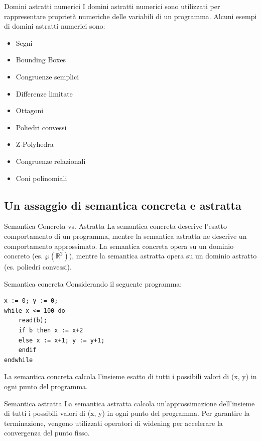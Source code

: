\begin{definizione}{Domini astratti numerici}{}
I domini astratti numerici sono utilizzati per rappresentare proprietà
numeriche delle variabili di un programma.
Alcuni esempi di domini astratti numerici sono:
\begin{itemize}
    \item Segni
    \item Bounding Boxes
    \item Congruenze semplici
    \item Differenze limitate
    \item Ottagoni
    \item Poliedri convessi
    \item Z-Polyhedra
    \item Congruenze relazionali
    \item Coni polinomiali
\end{itemize}
\end{definizione}

\subsection{Un assaggio di semantica concreta e astratta}

\begin{nota}{Semantica Concreta vs. Astratta}{}
La semantica concreta descrive l'esatto comportamento di un programma,
mentre la semantica astratta ne descrive un comportamento approssimato.
La semantica concreta opera su un dominio concreto (es. $\wp(\mathbb{R}^2)$),
mentre la semantica astratta opera su un dominio astratto (es. poliedri
convessi).
\end{nota}

\begin{esempio}{Semantica concreta}{}
Considerando il seguente programma:
\begin{verbatim}
x := 0; y := 0;
while x <= 100 do
    read(b);
    if b then x := x+2
    else x := x+1; y := y+1;
    endif
endwhile
\end{verbatim}
La semantica concreta calcola l'insieme esatto di tutti i possibili valori
di (x, y) in ogni punto del programma.
\end{esempio}

\begin{esempio}{Semantica astratta}{}
La semantica astratta calcola un'approssimazione dell'insieme di tutti i
possibili valori di (x, y) in ogni punto del programma.
Per garantire la terminazione, vengono utilizzati operatori di widening per
accelerare la convergenza del punto fisso.
\end{esempio}
